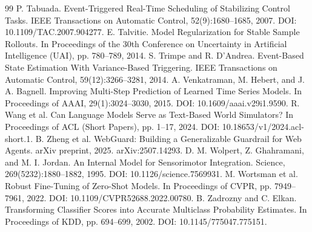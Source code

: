 \documentclass[11pt]{article}
\begin{document}
\begin{thebibliography}{99}
 P. Tabuada. Event-Triggered Real-Time Scheduling of Stabilizing Control Tasks. IEEE Transactions on Automatic Control, 52(9):1680--1685, 2007. DOI: 10.1109/TAC.2007.904277.
 E. Talvitie. Model Regularization for Stable Sample Rollouts. In Proceedings of the 30th Conference on Uncertainty in Artificial Intelligence (UAI), pp. 780--789, 2014.
 S. Trimpe and R. D'Andrea. Event-Based State Estimation With Variance-Based Triggering. IEEE Transactions on Automatic Control, 59(12):3266--3281, 2014.
 A. Venkatraman, M. Hebert, and J. A. Bagnell. Improving Multi-Step Prediction of Learned Time Series Models. In Proceedings of AAAI, 29(1):3024--3030, 2015. DOI: 10.1609/aaai.v29i1.9590.
 R. Wang et al. Can Language Models Serve as Text-Based World Simulators? In Proceedings of ACL (Short Papers), pp. 1--17, 2024. DOI: 10.18653/v1/2024.acl-short.1.
 B. Zheng et al. WebGuard: Building a Generalizable Guardrail for Web Agents. arXiv preprint, 2025. arXiv:2507.14293.
 D. M. Wolpert, Z. Ghahramani, and M. I. Jordan. An Internal Model for Sensorimotor Integration. Science, 269(5232):1880--1882, 1995. DOI: 10.1126/science.7569931.
 M. Wortsman et al. Robust Fine-Tuning of Zero-Shot Models. In Proceedings of CVPR, pp. 7949--7961, 2022. DOI: 10.1109/CVPR52688.2022.00780.
 B. Zadrozny and C. Elkan. Transforming Classifier Scores into Accurate Multiclass Probability Estimates. In Proceedings of KDD, pp. 694--699, 2002. DOI: 10.1145/775047.775151.
\end{thebibliography}
\end{document}
